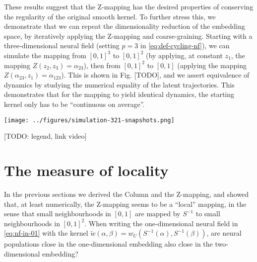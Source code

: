 \documentclass[10pt,letterpaper]{article}
\begin{document}
These results suggest that the Z-mapping has the desired properties of conserving the regularity of the original smooth kernel. To further stress this, we demonstrate that we can repeat the dimensionality reduction of the embedding space, by iteratively applying the Z-mapping and coarse-graining. Starting with a three-dimensional neural field (setting $p=3$ in \autoref{eq:def-cycling-nf}), we can simulate the mapping from $[0,1]^3$ to $[0,1]^2$ (by applying, at constant $z_1$, the mapping $Z(z_2,z_3) = \alpha_{23}$), then from $[0,1]^2$ to $[0,1]$ (applying the mapping $Z(\alpha_{23},z_1)=\alpha_{123}$). This is shown in Fig. [TODO], and we assert equivalence of dynamics by studying the numerical equality of the latent trajectories. This demonstrates that for the mapping to yield identical dynamics, the starting kernel only has to be ``continuous on average''.

\texttt{[image: ../figures/simulation-321-snapshots.png]}

[TODO: legend, link video]
\endif

\section{The measure of locality}

In the previous sections we derived the Column and the Z-mapping, and showed that, at least numerically, the Z-mapping seems to be a ``local'' mapping, in the sense that small neighbourhoods in $[0,1]$ are mapped by $S^{-1}$ to small neighbourhoods in $[0,1]^2$. When writing the one-dimensional neural field in \autoref{eq:nf-in-01} with the kernel $\tilde w(\alpha,\beta) = w_U(S^{-1}(\alpha), S^{-1}(\beta))$, are neural populations close in the one-dimensional embedding also close in the two-dimensional embedding?

\end{document}

